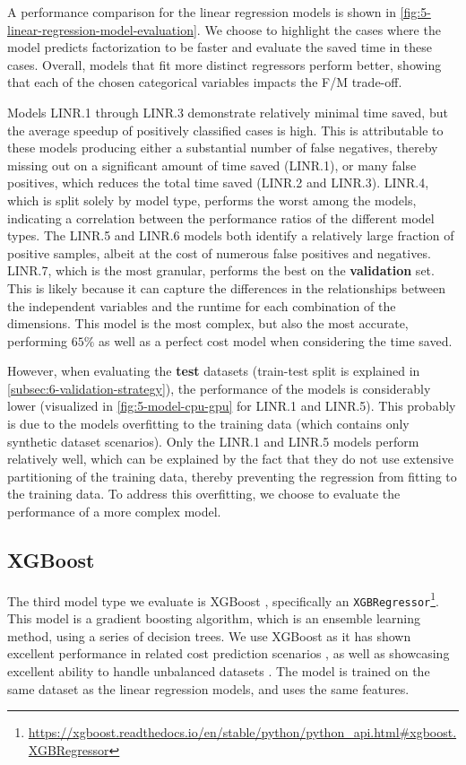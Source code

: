A performance comparison for the linear regression models is shown in \autoref{fig:5-linear-regression-model-evaluation}. We choose to highlight the cases where the model predicts factorization to be faster and evaluate the saved time in these cases. Overall, models that fit more distinct regressors perform better, showing that each of the chosen categorical variables impacts the F/M trade-off.

Models LINR.1 through LINR.3 demonstrate relatively minimal time saved, but the average speedup of positively classified cases is high. This is attributable to these models producing either a substantial number of false negatives, thereby missing out on a significant amount of time saved (LINR.1), or many false positives, which reduces the total time saved (LINR.2 and LINR.3). LINR.4, which is split solely by model type, performs the worst among the models, indicating a correlation between the performance ratios of the different model types. The LINR.5 and LINR.6 models both identify a relatively large fraction of positive samples, albeit at the cost of numerous false positives and negatives. LINR.7, which is the most granular, performs the best on the \textbf{validation} set. This is likely because it can capture the differences in the relationships between the independent variables and the runtime for each combination of the dimensions. This model is the most complex, but also the most accurate, performing $65\%$ as well as a perfect cost model when considering the time saved.

However, when evaluating the \textbf{test} datasets (train-test split is explained in \autoref{subsec:6-validation-strategy}), the performance of the models is considerably lower (visualized in \autoref{fig:5-model-cpu-gpu} for LINR.1 and LINR.5). This probably is due to the models overfitting to the training data (which contains only synthetic dataset scenarios). Only the LINR.1 and LINR.5 models perform relatively well, which can be explained by the fact that they do not use extensive partitioning of the training data, thereby preventing the regression from fitting to the training data. To address this overfitting, we choose to evaluate the performance of a more complex model.

\subsection{XGBoost}
\label{subsec:5-xgboost}
The third model type we evaluate is XGBoost \cite{xgboost}, specifically an \texttt{XGBRegressor}\footnote{\url{https://xgboost.readthedocs.io/en/stable/python/python_api.html\#xgboost.XGBRegressor}}. This model is a gradient boosting algorithm, which is an ensemble learning method, using a series of decision trees. We use XGBoost as it has shown excellent performance in related cost prediction scenarios \cite{tvm}, as well as showcasing excellent ability to handle unbalanced datasets \cite{xgboost_imbalanced_data}. The model is trained on the same dataset as the linear regression models, and uses the same features.

